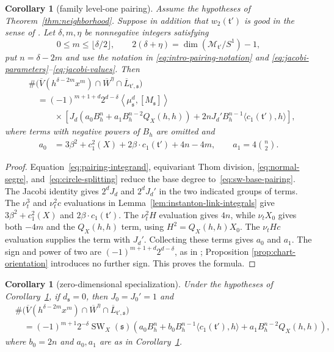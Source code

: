 \documentclass[11pt]{amsart}
\newtheorem{corollary}[theorem]{Corollary}
\theoremstyle{definition}
\theoremstyle{remark}
\theoremstyle{plain}
\newcommand{\cM}{\mathcal{M}}
\newcommand{\SW}{\operatorname{SW}}
\begin{document}
\begin{corollary}[family level-one pairing]\label{cor:pairing}\label{cor:intro-pairing}
Assume the hypotheses of Theorem~\ref{thm:neighborhood}.
Suppose in addition that
$w_2(\mathfrak t')$ is good in the sense of
\cite[Definition~2.3]{FeehanLenessLevelOne}.  Let $\delta,m,\eta$ be
nonnegative integers satisfying
\[
 0\leq m\leq\lfloor\delta/2\rfloor,
 \qquad
 2(\delta+\eta)=\dim(\cM_{\mathfrak t'}/S^1)-1,
\]
put $n=\delta-2m$ and use the notation in
\eqref{eq:intro-pairing-notation} and
\eqref{eq:jacobi-parameters}--\eqref{eq:jacobi-values}.  Then
\begin{align*}
&\#\bigl(\overline V(h^{\delta-2m}x^m)\cap\overline W^\eta
\cap\overline L_{\mathfrak t',\mathfrak s}\bigr)\\
&\quad=(-1)^{m+1+d}2^{d-\delta}
\left\langle\mu_{\mathfrak s}^{d},[M_{\mathfrak s}]\right\rangle\\
&\qquad\quad\times
\left[J_d\left(a_0B_h^n+a_1B_h^{n-2}Q_X(h,h)\right)
+2nJ_d'B_h^{n-1}\langle c_1(\mathfrak t'),h\rangle\right],
\end{align*}
where terms with negative powers of $B_h$ are omitted and
\begin{align*}
 a_0&=3\beta^2+c_1^2(X)+2\beta\cdot c_1(\mathfrak t')
 +4n-4m,\qquad
 a_1=4\binom n2.
\end{align*}
\end{corollary}

\begin{proof}
Equation~\eqref{eq:pairing-integrand}, equivariant Thom division,
\eqref{eq:normal-segre}, and~\eqref{eq:circle-splitting} reduce the base
degree to~\eqref{eq:sw-base-pairing}.  The Jacobi identity gives $2^dJ_d$
and $2^dJ_d'$ in the two indicated groups of terms.
The $\nu_t^3$ and $\nu_t^2c$ evaluations in
Lemma~\ref{lem:instanton-link-integrals} give
$3\beta^2+c_1^2(X)$ and $2\beta\cdot c_1(\mathfrak t')$.
The $\nu_t^2H$ evaluation gives $4n$, while $\nu_tX_0$ gives
both $-4m$ and the $Q_X(h,h)$ term, using $H^2=Q_X(h,h)X_0$.
The $\nu_tHc$ evaluation supplies the term with $J_d'$.
Collecting these terms gives $a_0$ and $a_1$.
The sign and power of two are
$(-1)^{m+1+d}2^{d-\delta}$, as in
\cite[Equations~(6.15)--(6.18)]{FeehanLenessLevelOne}; Proposition
\ref{prop:chart-orientation} introduces no further sign.  This proves the
formula.
\end{proof}

\begin{corollary}[zero-dimensional specialization]
\label{cor:zero-dimensional-pairing}
Under the hypotheses of Corollary~\ref{cor:pairing}, if
$d_{\mathfrak s}=0$, then $J_0=J_0'=1$ and
\begin{align*}
&\#\bigl(\overline V(h^{\delta-2m}x^m)\cap\overline W^\eta
\cap\overline L_{\mathfrak t',\mathfrak s}\bigr)\\
&\quad=(-1)^{m+1}2^{-\delta}\SW_X(\mathfrak s)
\left(a_0B_h^n+b_0B_h^{n-1}\langle c_1(\mathfrak t'),h\rangle
+a_1B_h^{n-2}Q_X(h,h)\right),
\end{align*}
where $b_0=2n$ and $a_0,a_1$ are as in Corollary~\ref{cor:pairing}.
\end{corollary}
\end{document}
